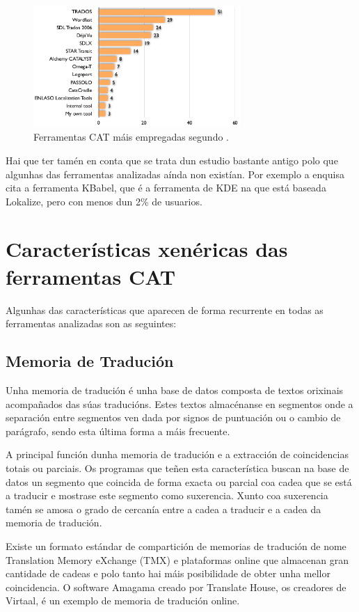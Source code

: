 \begin{figure}[h]
    \centering
    \includegraphics[width=0.7\textwidth]{img/grafico_uso_cat_enquisa2006.png}
    \caption{Ferramentas CAT máis empregadas segundo \cite{article:2006survey}.}
    \label{fig:enquisa2006}
\end{figure}

Hai que ter tamén en conta que se trata dun estudio bastante antigo polo que algunhas das ferramentas analizadas aínda non existían. Por exemplo a enquisa cita a ferramenta KBabel, que é a ferramenta de KDE na que está baseada Lokalize, pero con menos dun 2\% de usuarios.


\section{Características xenéricas das ferramentas CAT}

Algunhas das características que aparecen de forma recurrente en todas as ferramentas analizadas son as seguintes:

\subsection{Memoria de Tradución}
Unha memoria de tradución é unha base de datos composta de textos orixinais acompañados das súas traducións. Estes textos almacénanse en segmentos onde a separación entre segmentos ven dada por signos de puntuación ou o cambio de parágrafo, sendo esta última forma a máis frecuente.

A principal función dunha memoria de tradución e a extracción de coincidencias totais ou parciais. Os programas que teñen esta característica buscan na base de datos un segmento que coincida de forma exacta ou parcial coa cadea que se está a traducir e mostrase este segmento como suxerencia. Xunto coa suxerencia tamén se amosa o grado de cercanía entre a cadea a traducir e a cadea da memoria de tradución.

Existe un formato estándar de compartición de memorias de tradución de nome Translation Memory eXchange (TMX) e plataformas online que almacenan gran cantidade de cadeas e polo tanto hai máis posibilidade de obter unha mellor coincidencia. O software Amagama creado por Translate House, os creadores de Virtaal, é un exemplo de memoria de tradución online.

